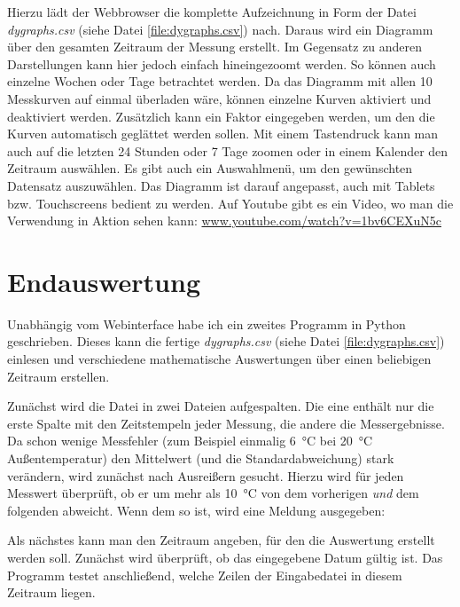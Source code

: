 Hierzu lädt der Webbrowser die komplette Aufzeichnung in Form der Datei \emph{dygraphs.csv} (siehe Datei \ref{file:dygraphs.csv}) nach. Daraus wird ein Diagramm über den gesamten Zeitraum der Messung erstellt. Im Gegensatz zu anderen Darstellungen kann hier jedoch einfach hineingezoomt werden. So können auch einzelne Wochen oder Tage betrachtet werden. Da das Diagramm mit allen 10 Messkurven auf einmal überladen wäre, können einzelne Kurven aktiviert und deaktiviert werden. Zusätzlich kann ein Faktor eingegeben werden, um den die Kurven automatisch geglättet werden sollen. Mit einem Tastendruck kann man auch auf die letzten 24 Stunden oder 7 Tage zoomen oder in einem Kalender den Zeitraum auswählen. Es gibt auch ein Auswahlmenü, um den gewünschten Datensatz auszuwählen. Das Diagramm ist darauf angepasst, auch mit Tablets bzw. Touchscreens bedient zu werden.
Auf Youtube gibt es ein Video, wo man die Verwendung in Aktion sehen kann: \href{https://www.youtube.com/watch?v=1bv6CEXuN5c}{www.youtube.com/watch?v=1bv6CEXuN5c}

\section{Endauswertung}
\label{sec:Endauswertung}

Unabhängig vom Webinterface habe ich ein zweites Programm in \gls{Python} geschrieben. Dieses kann die fertige \emph{dygraphs.csv} (siehe Datei \ref{file:dygraphs.csv}) einlesen und verschiedene mathematische Auswertungen über einen beliebigen Zeitraum erstellen.

Zunächst wird die Datei in zwei Dateien aufgespalten. Die eine enthält nur die erste Spalte mit den Zeitstempeln jeder Messung, die andere die Messergebnisse. Da schon wenige Messfehler (zum Beispiel einmalig \SI{6}{\degreeCelsius} bei \SI{20}{\degreeCelsius} Außentemperatur) den Mittelwert (und die \gls{Standardabweichung}) stark verändern, wird zunächst nach Ausreißern gesucht. Hierzu wird für jeden Messwert überprüft, ob er um mehr als \SI{10}{\degreeCelsius} von dem vorherigen \emph{und} dem folgenden abweicht. Wenn dem so ist, wird eine Meldung ausgegeben:


Als nächstes kann man den Zeitraum angeben, für den die Auswertung erstellt werden soll. Zunächst wird überprüft, ob das eingegebene Datum gültig ist. Das Programm testet anschließend, welche Zeilen der Eingabedatei in diesem Zeitraum liegen.

